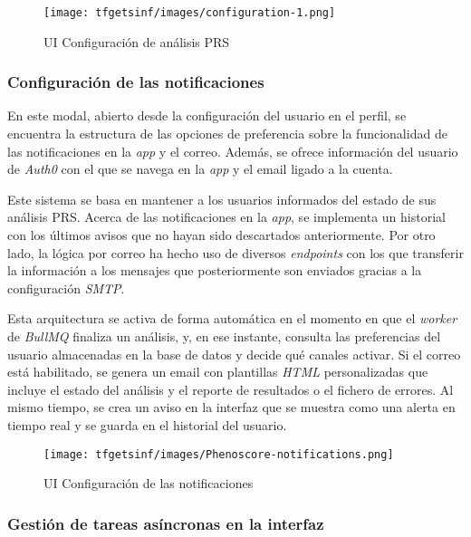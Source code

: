 \begin{figure}[H]
    \centering
    \texttt{[image: tfgetsinf/images/configuration-1.png]}
    \caption{UI Configuración de análisis PRS}
    \label{fig:UIConfiguración}
\end{figure}

\subsubsection{Configuración de las notificaciones}
En este modal, abierto desde la configuración del usuario en el perfil, se encuentra la estructura de las opciones de preferencia sobre la funcionalidad de las notificaciones en la \textit{app} y el correo. Además, se ofrece información del usuario de \textit{Auth0} con el que se navega en la \textit{app} y el email ligado a la cuenta.

Este sistema se basa en mantener a los usuarios informados del estado de sus análisis PRS. Acerca de las notificaciones en la \textit{app}, se implementa un historial con los últimos avisos que no hayan sido descartados anteriormente. Por otro lado, la lógica por correo ha hecho uso de diversos \textit{endpoints} con los que transferir la información a los mensajes que posteriormente son enviados gracias a la configuración \textit{SMTP}.

Esta arquitectura se activa de forma automática en el momento en que el \textit{worker} de \textit{BullMQ} finaliza un análisis, y, en ese instante, consulta las preferencias del usuario almacenadas en la base de datos y decide qué canales activar.
Si el correo está habilitado, se genera un email con plantillas \textit{HTML} personalizadas que incluye el estado del análisis y el reporte de resultados o el fichero de errores. Al mismo tiempo, se crea un aviso en la interfaz que se muestra como una alerta en tiempo real y se guarda en el historial del usuario.

\begin{figure}[H]
    \centering
    \texttt{[image: tfgetsinf/images/Phenoscore-notifications.png]}
    \caption{UI Configuración de las notificaciones}
    \label{fig:UINotificaciones}
\end{figure}

\subsubsection{Gestión de tareas asíncronas en la interfaz}

